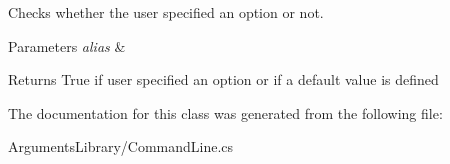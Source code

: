 Checks whether the user specified an option or not. 


\begin{DoxyParams}{Parameters}
{\em alias} & \\
\hline
\end{DoxyParams}
\begin{DoxyReturn}{Returns}
True if user specified an option or if a default value is defined
\end{DoxyReturn}


The documentation for this class was generated from the following file\+:\begin{DoxyCompactItemize}
\item 
Arguments\+Library/Command\+Line.\+cs\end{DoxyCompactItemize}
